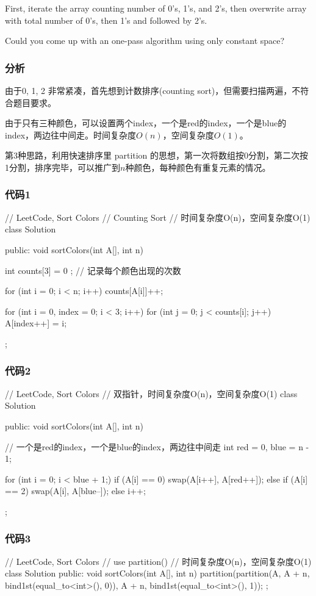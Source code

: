 First, iterate the array counting number of 0's, 1's, and 2's, then overwrite array with total number of 0's, then 1's and followed by 2's.

Could you come up with an one-pass algorithm using only constant space?


\subsubsection{分析}
由于0, 1, 2 非常紧凑，首先想到计数排序(counting sort)，但需要扫描两遍，不符合题目要求。

由于只有三种颜色，可以设置两个index，一个是red的index，一个是blue的index，两边往中间走。时间复杂度$O(n)$，空间复杂度$O(1)$。

第3种思路，利用快速排序里 partition 的思想，第一次将数组按0分割，第二次按1分割，排序完毕，可以推广到$n$种颜色，每种颜色有重复元素的情况。


\subsubsection{代码1}
\begin{Code}
	// LeetCode, Sort Colors
	// Counting Sort
	// 时间复杂度O(n)，空间复杂度O(1)
	class Solution {
		public:
		void sortColors(int A[], int n) {
			int counts[3] = { 0 }; // 记录每个颜色出现的次数
			
			for (int i = 0; i < n; i++)
			counts[A[i]]++;
			
			for (int i = 0, index = 0; i < 3; i++)
			for (int j = 0; j < counts[i]; j++)
			A[index++] = i;
			
		}
	};
\end{Code}


\subsubsection{代码2}
\begin{Code}
	// LeetCode, Sort Colors
	// 双指针，时间复杂度O(n)，空间复杂度O(1)
	class Solution {
		public:
		void sortColors(int A[], int n) {
			// 一个是red的index，一个是blue的index，两边往中间走
			int red = 0, blue = n - 1;
			
			for (int i = 0; i < blue + 1;) {
				if (A[i] == 0)
				swap(A[i++], A[red++]);
				else if (A[i] == 2)
				swap(A[i], A[blue--]);
				else
				i++;
			}
		}
	};
\end{Code}


\subsubsection{代码3}
\begin{Code}
	// LeetCode, Sort Colors
	// use partition()
	// 时间复杂度O(n)，空间复杂度O(1)
	class Solution {
		public:
		void sortColors(int A[], int n) {
			partition(partition(A, A + n, bind1st(equal_to<int>(), 0)), A + n,
			bind1st(equal_to<int>(), 1));
		}
	};
\end{Code}


